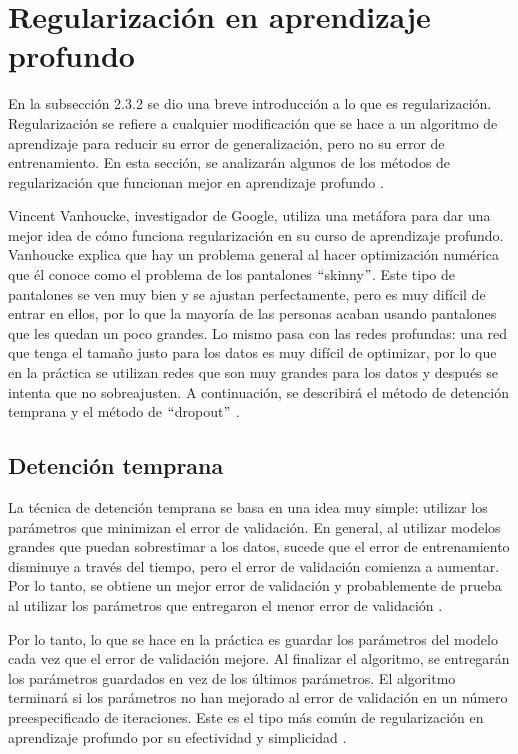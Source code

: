 \section{Regularización en aprendizaje profundo}
En la subsección 2.3.2 se dio una breve introducción a lo que es regularización. Regularización se refiere a cualquier modificación que se hace a un algoritmo de aprendizaje para reducir su error de generalización, pero no su error de entrenamiento. En esta sección, se analizarán algunos de los métodos de regularización que funcionan mejor en aprendizaje profundo \cite{goodfellow-et-al-2016}.

\vspace{1em}

Vincent Vanhoucke, investigador de Google, utiliza una metáfora para dar una mejor idea de cómo funciona regularización en su curso de aprendizaje profundo. Vanhoucke explica que hay un problema general al hacer optimización numérica que él conoce como el problema de los pantalones $``$skinny$"$. Este tipo de pantalones se ven muy bien y se ajustan perfectamente, pero es muy difícil de entrar en ellos, por lo que la mayoría de las personas acaban usando pantalones que les quedan un poco grandes. Lo mismo pasa con las redes profundas: una red que tenga el tamaño justo para los datos es muy difícil de optimizar, por lo que en la práctica se utilizan redes que son muy grandes para los datos y después se intenta que no sobreajusten. A continuación, se describirá el método de detención temprana y el método de $``$dropout$"$ \cite{deeplearningbygoogle}.

\subsection{Detención temprana}
La técnica de detención temprana se basa en una idea muy simple: utilizar los parámetros que minimizan el error de validación. En general, al utilizar modelos grandes que puedan sobrestimar a los datos, sucede que el error de entrenamiento disminuye a través del tiempo, pero el error de validación comienza a aumentar. Por lo tanto, se obtiene un mejor error de validación y probablemente de prueba al utilizar los parámetros que entregaron el menor error de validación \cite{goodfellow-et-al-2016}.

\vspace{1em}

Por lo tanto, lo que se hace en la práctica es guardar los parámetros del modelo cada vez que el error de validación mejore. Al finalizar el algoritmo, se entregarán los parámetros guardados en vez de los últimos parámetros. El algoritmo terminará si los parámetros no han mejorado al error de validación en un número preespecificado de iteraciones. Este es el tipo más común de regularización en aprendizaje profundo por su efectividad y simplicidad \cite{goodfellow-et-al-2016}.

